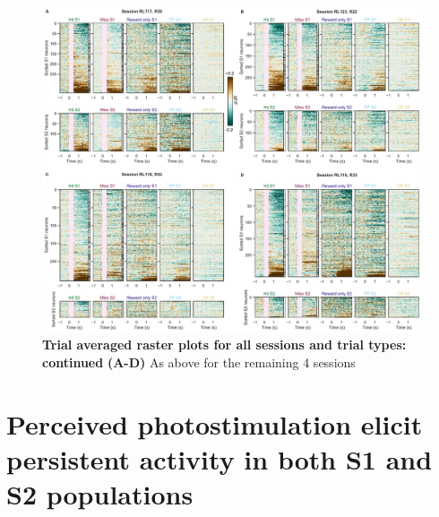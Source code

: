 \begin{figure}[h]
\hspace*{-0.6in}
\includegraphics[scale=0.45]{figures/supplements/Supplementary_Figure3.pdf}
\caption[\textbf{Trial averaged raster plots for all sessions and trial types: continued}]{\textbf{Trial averaged raster plots for all sessions and trial types: continued}
\textbf{(A-D)} As above for the remaining 4 sessions
} 
\label{fig:supp3}
\end{figure}

\section{Perceived photostimulation elicit persistent activity in both S1 and S2 populations}

